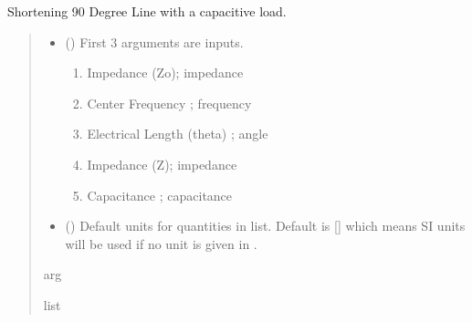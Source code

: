 \documentclass[letterpaper,10pt,english]{sphinxmanual}
\begin{document}
\begin{fulllineitems}
\label{\detokenize{components:components.Shorten90DegreeLine}}
\pysigstartsignatures
{}
\pysigstopsignatures
\sphinxAtStartPar
Shortening 90 Degree Line with a capacitive load.
\begin{quote}\begin{description}
\begin{itemize}
\item {} 
\sphinxAtStartPar
{} () \textendash{} 
\sphinxAtStartPar
First 3 arguments are inputs.
\begin{enumerate}
%
\item {} 
\sphinxAtStartPar
Impedance (Zo); impedance

\item {} 
\sphinxAtStartPar
Center Frequency ;  frequency

\item {} 
\sphinxAtStartPar
Electrical Length (theta) ; angle

\item {} 
\sphinxAtStartPar
Impedance (Z); impedance

\item {} 
\sphinxAtStartPar
Capacitance ; capacitance

\end{enumerate}


\item {} 
\sphinxAtStartPar
{} (\sphinxstyleliteralemphasis{\sphinxupquote{, }}) \textendash{} Default units for quantities in  list. Default is {[}{]} which means SI units will be used if no unit is given in .

\end{itemize}

\sphinxAtStartPar
arg

\sphinxAtStartPar
list

\end{description}\end{quote}

\end{fulllineitems}
\end{document}
